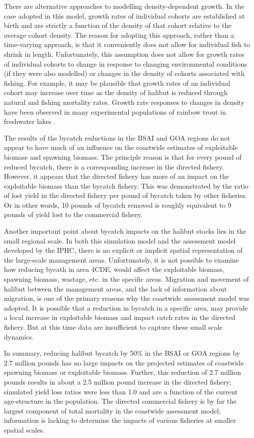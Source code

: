 There are alternative approaches to modelling density-dependent growth.  In the case adopted in this model, growth rates of individual cohorts are established at birth and are strictly a function of the density of that cohort relative to the average cohort density.  The reason for adopting this approach, rather than a time-varying approach, is that it conveniently does not allow for individual fish to shrink in length.  Unfortunately, this assumption does not allow for growth rates of individual cohorts to change in response to changing environmental conditions (if they were also modelled) or changes in the density of cohorts associated with fishing.  For example, it may be plausible that growth rates of an individual cohort may increase over time as the density of halibut is reduced through natural and fishing mortality rates.  Growth rate responses to changes in density have been observed in many experimental populations of rainbow trout in freshwater lakes \citep{post1999density}. 

The results of the bycatch reductions in the BSAI and GOA regions do not appear to have much of an influence on the coastwide estimates of exploitable biomass and spawning biomass.  The principle reason is that for every pound of reduced bycatch, there is a corresponding increase in the directed fishery.  However, it appears that the directed fishery has more of an impact on the exploitable biomass than the bycatch fishery.  This was demonstrated by the ratio of lost yield in the directed fishery per pound of bycatch taken by other fisheries.  Or in other words, 10 pounds of bycatch removed is roughly equivalent to 9 pounds of yield lost to the commercial fishery. 

Another important point about bycatch impacts on the halibut stocks lies in the small regional scale.  In both this simulation model and the assessment model developed by the IPHC, there is no explicit  or implicit spatial representation of the large-scale management areas.  Unfortunately, it is not possible to examine how reducing bycath in area 4CDE, would affect the exploitable biomass, spawning biomass, wastage, etc.  in the specific areas.  Migration and movement of halibut between the management areas, and the lack of information about migration,  is one of the primary reasons why the coastwide assessment model was adopted.  It is possible that a reduction in bycatch in a specific area, may provide a local increase in exploitable biomass and impact catch rates in the directed fishery.  But at this time data are insufficient to capture these small scale dynamics.

In summary, reducing halibut bycatch by 50\% in the BSAI or GOA regions by 2.7 million pounds has no large impacts on the projected estimates of coastwide spawning biomass or exploitable biomass.  Further, this reduction of 2.7 million pounds results in about a 2.5 million pound increase in the directed fishery; simulated yield loss ratios were less than 1.0 and are a function of the current age-structure in the population.  The directed commercial fishery is by far the largest component of total mortality in the coastwide assessment model; information is lacking to determine the impacts of various fisheries at smaller spatial scales.

